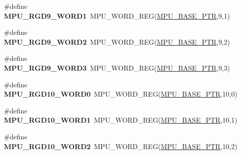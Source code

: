\begin{DoxyCompactItemize}
\item 
\hypertarget{group___m_p_u___register___accessor___macros_ga7874f68e3ee26a23e1e2dd66849412b9}{}\#define {\bfseries M\+P\+U\+\_\+\+R\+G\+D9\+\_\+\+W\+O\+R\+D1}~M\+P\+U\+\_\+\+W\+O\+R\+D\+\_\+\+R\+E\+G(\hyperlink{group___m_p_u___peripheral_gae2d60f80178d84225d77e5f0214d1f1d}{M\+P\+U\+\_\+\+B\+A\+S\+E\+\_\+\+P\+T\+R},9,1)\label{group___m_p_u___register___accessor___macros_ga7874f68e3ee26a23e1e2dd66849412b9}

\item 
\hypertarget{group___m_p_u___register___accessor___macros_gad453aa3cdcea423c32345af2d3fdcd3c}{}\#define {\bfseries M\+P\+U\+\_\+\+R\+G\+D9\+\_\+\+W\+O\+R\+D2}~M\+P\+U\+\_\+\+W\+O\+R\+D\+\_\+\+R\+E\+G(\hyperlink{group___m_p_u___peripheral_gae2d60f80178d84225d77e5f0214d1f1d}{M\+P\+U\+\_\+\+B\+A\+S\+E\+\_\+\+P\+T\+R},9,2)\label{group___m_p_u___register___accessor___macros_gad453aa3cdcea423c32345af2d3fdcd3c}

\item 
\hypertarget{group___m_p_u___register___accessor___macros_gaba366a48928d4c195c3450986ca98603}{}\#define {\bfseries M\+P\+U\+\_\+\+R\+G\+D9\+\_\+\+W\+O\+R\+D3}~M\+P\+U\+\_\+\+W\+O\+R\+D\+\_\+\+R\+E\+G(\hyperlink{group___m_p_u___peripheral_gae2d60f80178d84225d77e5f0214d1f1d}{M\+P\+U\+\_\+\+B\+A\+S\+E\+\_\+\+P\+T\+R},9,3)\label{group___m_p_u___register___accessor___macros_gaba366a48928d4c195c3450986ca98603}

\item 
\hypertarget{group___m_p_u___register___accessor___macros_ga57da8ab5ca2e0258c510d1dd6486fbe4}{}\#define {\bfseries M\+P\+U\+\_\+\+R\+G\+D10\+\_\+\+W\+O\+R\+D0}~M\+P\+U\+\_\+\+W\+O\+R\+D\+\_\+\+R\+E\+G(\hyperlink{group___m_p_u___peripheral_gae2d60f80178d84225d77e5f0214d1f1d}{M\+P\+U\+\_\+\+B\+A\+S\+E\+\_\+\+P\+T\+R},10,0)\label{group___m_p_u___register___accessor___macros_ga57da8ab5ca2e0258c510d1dd6486fbe4}

\item 
\hypertarget{group___m_p_u___register___accessor___macros_gaea7680347f24883ee109acbc2b334e1c}{}\#define {\bfseries M\+P\+U\+\_\+\+R\+G\+D10\+\_\+\+W\+O\+R\+D1}~M\+P\+U\+\_\+\+W\+O\+R\+D\+\_\+\+R\+E\+G(\hyperlink{group___m_p_u___peripheral_gae2d60f80178d84225d77e5f0214d1f1d}{M\+P\+U\+\_\+\+B\+A\+S\+E\+\_\+\+P\+T\+R},10,1)\label{group___m_p_u___register___accessor___macros_gaea7680347f24883ee109acbc2b334e1c}

\item 
\hypertarget{group___m_p_u___register___accessor___macros_ga698b2e5c89e0e58944a6e8bf16b9f6ac}{}\#define {\bfseries M\+P\+U\+\_\+\+R\+G\+D10\+\_\+\+W\+O\+R\+D2}~M\+P\+U\+\_\+\+W\+O\+R\+D\+\_\+\+R\+E\+G(\hyperlink{group___m_p_u___peripheral_gae2d60f80178d84225d77e5f0214d1f1d}{M\+P\+U\+\_\+\+B\+A\+S\+E\+\_\+\+P\+T\+R},10,2)\label{group___m_p_u___register___accessor___macros_ga698b2e5c89e0e58944a6e8bf16b9f6ac}


\end{DoxyCompactItemize}
